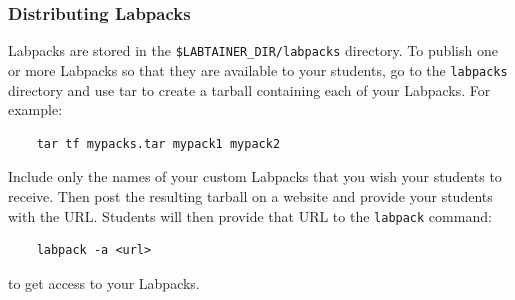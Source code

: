\documentclass[12pt]{article}
\begin{document}
\subsubsection{Distributing Labpacks}
Labpacks are stored in the {\tt \$LABTAINER\_DIR/labpacks} directory.  To publish one or more Labpacks so that
they are available to your students, go to the {\tt labpacks} directory and use tar to create a tarball containing
each of your Labpacks.  For example:
\begin{verbatim}
    tar tf mypacks.tar mypack1 mypack2
\end{verbatim}
\noindent Include only the names of your custom Labpacks that you wish your students to receive.
Then post the resulting tarball on a website and provide your students with the URL.  Students will then
provide that URL to the {\tt labpack} command:
\begin{verbatim}
    labpack -a <url>
\end{verbatim}
\noindent to get access to your Labpacks.
\newpage
\end{document}

